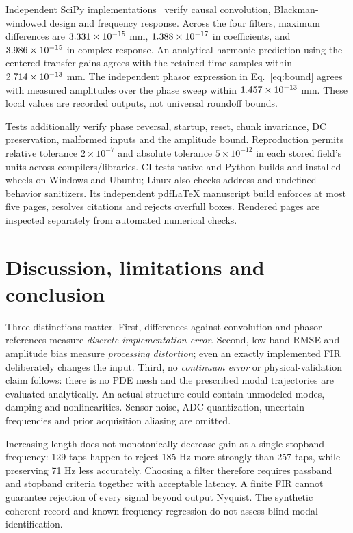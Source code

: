 \documentclass[10pt,a4paper]{article}
\begin{document}
Independent SciPy implementations~\cite{scipy} verify causal convolution,
Blackman-windowed design and frequency response. Across the four filters, maximum
differences are $3.331\times10^{-15}$ mm, $1.388\times10^{-17}$ in coefficients, and
$3.986\times10^{-15}$ in complex response. An analytical harmonic prediction using
the centered transfer gains agrees with the retained time samples within
$2.714\times10^{-13}$ mm. The independent phasor expression in Eq.~\eqref{eq:bound}
agrees with measured amplitudes over the phase sweep within $1.457\times10^{-13}$ mm.
These local values are recorded outputs, not universal roundoff bounds.

Tests additionally verify phase reversal, startup, reset, chunk invariance,
DC preservation, malformed inputs and the amplitude bound. Reproduction permits
relative tolerance $2\times10^{-7}$ and absolute tolerance $5\times10^{-12}$ in
each stored field's units across compilers/libraries. CI tests native and Python
builds and installed wheels on Windows and Ubuntu; Linux also checks address and
undefined-behavior sanitizers. Its independent pdfLaTeX manuscript build enforces
at most five pages, resolves citations and rejects overfull boxes. Rendered pages
are inspected separately from automated numerical checks.

\section{Discussion, limitations and conclusion}
Three distinctions matter. First, differences against convolution and phasor
references measure \emph{discrete implementation error}. Second, low-band RMSE
and amplitude bias measure \emph{processing distortion}; even an exactly
implemented FIR deliberately changes the input. Third, no \emph{continuum error}
or physical-validation claim follows: there is no PDE mesh and the prescribed
modal trajectories are evaluated analytically. An actual structure could contain
unmodeled modes, damping and nonlinearities. Sensor noise, ADC quantization,
uncertain frequencies and prior acquisition aliasing are omitted.

Increasing length does not monotonically decrease gain at a single stopband
frequency: 129 taps happen to reject 185 Hz more strongly than 257 taps, while
preserving 71 Hz less accurately. Choosing a filter therefore requires passband
and stopband criteria together with acceptable latency. A finite FIR cannot
guarantee rejection of every signal beyond output Nyquist. The synthetic coherent
record and known-frequency regression do not assess blind modal identification.
\end{document}
